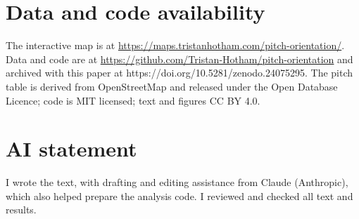\documentclass[11pt,a4paper]{article}
\begin{document}
\section*{Data and code availability}
The interactive map is at \url{https://maps.tristanhotham.com/pitch-orientation/}. Data and code are at \url{https://github.com/Tristan-Hotham/pitch-orientation} and archived with this paper at https://doi.org/10.5281/zenodo.24075295. The pitch table is derived from OpenStreetMap and released under the Open Database Licence; code is MIT licensed; text and figures CC BY 4.0.

\section*{AI statement}
I wrote the text, with drafting and editing assistance from Claude (Anthropic), which also helped prepare the analysis code. I reviewed and checked all text and results.
\end{document}
